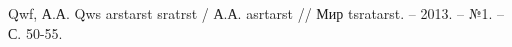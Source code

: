 \begingroup
\renewcommand{\section}[2]{\anonsection{Список использованных источников}}
\begin{thebibliography}{00}

    Qwf, А.А.
    Qws arstarst sratrst /
    А.А. asrtarst //
    Мир tsratarst. -- 2013. -- №1. -- С. 50-55.

\end{thebibliography}
\endgroup

\clearpage
